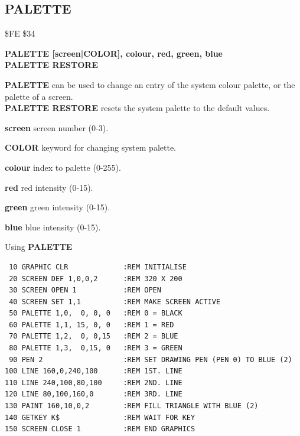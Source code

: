 \subsection{PALETTE}
\begin{description}[leftmargin=2cm,style=nextline]
\item [Token:] \$FE \$34
\item [Format:] {\bf PALETTE [screen|COLOR], colour, red, green, blue} \\
                {\bf PALETTE RESTORE}
\item [Usage:]  {\bf PALETTE} can be used to change an
                entry of the system colour palette, or the palette
                of a screen. \\
                {\bf PALETTE RESTORE} resets the system palette to
                the default values.

                {\bf screen} screen number (0-3).

                {\bf COLOR} keyword for changing system palette.

                {\bf colour} index to palette (0-255).

                {\bf red} red intensity (0-15).

                {\bf green} green intensity (0-15).

                {\bf blue} blue intensity (0-15).

\item [Example:] Using {\bf PALETTE}

\begin{tcolorbox}[colback=black,coltext=white]
\verbatimfont{\codefont}
\begin{verbatim}
 10 GRAPHIC CLR             :REM INITIALISE
 20 SCREEN DEF 1,0,0,2      :REM 320 X 200
 30 SCREEN OPEN 1           :REM OPEN
 40 SCREEN SET 1,1          :REM MAKE SCREEN ACTIVE
 50 PALETTE 1,0,  0, 0, 0   :REM 0 = BLACK
 60 PALETTE 1,1, 15, 0, 0   :REM 1 = RED
 70 PALETTE 1,2,  0, 0,15   :REM 2 = BLUE
 80 PALETTE 1,3,  0,15, 0   :REM 3 = GREEN
 90 PEN 2                   :REM SET DRAWING PEN (PEN 0) TO BLUE (2)
100 LINE 160,0,240,100      :REM 1ST. LINE
110 LINE 240,100,80,100     :REM 2ND. LINE
120 LINE 80,100,160,0       :REM 3RD. LINE
130 PAINT 160,10,0,2        :REM FILL TRIANGLE WITH BLUE (2)
140 GETKEY K$               :REM WAIT FOR KEY
150 SCREEN CLOSE 1          :REM END GRAPHICS
\end{verbatim}
\end{tcolorbox}
\end{description}

